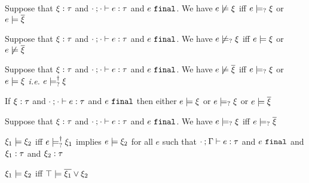 \begin{lem}
  \label{lem:neg-satisfy}
  Suppose that $\xi : \tau$ and $\cdot \mathbin{;} \cdot \vdash e : \tau$ and $e ~\mathtt{final}$. We have $e \not\models \xi$ iff $e \models_{?} \xi$ or $e \models \overline{\xi}$
\end{lem}
\begin{lem}
  \label{lem:neg-possible-satisfy}
  Suppose that $\xi : \tau$ and $\cdot \mathbin{;} \cdot \vdash e : \tau$ and $e ~\mathtt{final}$. We have $e \not\models_{?} \xi$ iff $e \models \xi$ or $e \not\models \overline{\xi}$
\end{lem}
\begin{lem}
  \label{lem:neg-dual-satisfy}
  Suppose that $\xi : \tau$ and $\cdot \mathbin{;} \cdot \vdash e : \tau$ and $e ~\mathtt{final}$. We have $e \not\models \overline{\xi}$ iff $e \models_{?} \xi$ or $e \models \xi$ \textit{i.e.} $e \models_{?}^{\dag} \xi$
\end{lem}
\begin{lem}
  \label{lem:coverage-constraint-satisfy}
  If $\xi : \tau$ and $\cdot \mathbin{;} \cdot \vdash e : \tau$ and $e ~\mathtt{final}$ then either $e \models \xi$ or $e \models_{?} \xi$ or $e \models \overline{\xi}$
\end{lem}

\begin{corol}
  \label{corol:possible-satisfy-dual}
  Suppose that $\xi : \tau$ and $\cdot \mathbin{;} \cdot \vdash e : \tau$ and $e ~\mathtt{final}$. We have $e \models_{?} \xi$ iff $e \models_{?} \overline{\xi}$
\end{corol}

\begin{defn}
  \label{defn:const-entailment}
  $\xi_1 \models \xi_2$ iff $e \models_{?}^{\dag} \xi_1$ implies $e \models \xi_2$ for all $e$ such that $\cdot \mathbin{;} \Gamma \vdash e : \tau$ and $e ~\mathtt{final}$ and $\xi_1 : \tau$ and $\xi_2 : \tau$
\end{defn}
\begin{corol}
  \label{lem:material-entailment}
  $\xi_1 \models \xi_2$ iff $\top \models \overline{\xi_1} \vee \xi_2$
\end{corol}

